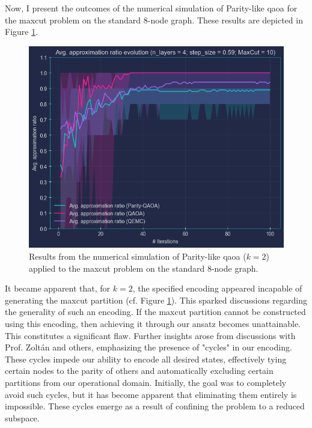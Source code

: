 Now, I present the outcomes of the numerical simulation of Parity-like \acrshort{qaoa} for the \acrshort{maxcut} problem on the standard $8$-node graph. These results are depicted in Figure \ref{fig:parity_qaoa_results}.
\begin{figure}[t]
    \centering
    \includegraphics[width=1\textwidth]{Figures/Chapter_6/Parity_QAOA.png}
    \caption{Results from the numerical simulation of Parity-like \acrshort{qaoa} ($k=2$) applied to the \acrshort{maxcut} problem on the standard $8$-node graph.}
    \label{fig:parity_qaoa_results}
\end{figure}
It became apparent that, for $k = 2$, the specified encoding appeared incapable of generating the \acrshort{maxcut} partition (cf. Figure \ref{fig:parity_qaoa_results}). This sparked discussions regarding the generality of such an encoding. If the \acrshort{maxcut} partition cannot be constructed using this encoding, then achieving it through our ansatz becomes unattainable. This constitutes a significant flaw. Further insights arose from discussions with Prof. Zoltán and others, emphasizing the presence of "cycles" in our encoding. These cycles impede our ability to encode all desired states, effectively tying certain nodes to the parity of others and automatically excluding certain partitions from our operational domain. Initially, the goal was to completely avoid such cycles, but it has become apparent that eliminating them entirely is impossible. These cycles emerge as a result of confining the problem to a reduced subspace.

